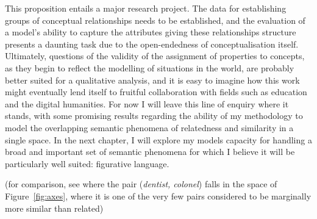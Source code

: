 This proposition entails a major research project.  The data for establishing groups of conceptual relationships needs to be established, and the evaluation of a model's ability to capture the attributes giving these relationships structure presents a daunting task due to the open-endedness of conceptualisation itself.  Ultimately, questions of the validity of the assignment of properties to concepts, as they begin to reflect the modelling of situations in the world, are probably better suited for a qualitative analysis, and it is easy to imagine how this work might eventually lend itself to fruitful collaboration with fields such as education and the digital humanities.  For now I will leave this line of enquiry where it stands, with some promising results regarding the ability of my methodology to model the overlapping semantic phenomena of relatedness and similarity in a single space.  In the next chapter, I will explore my models capacity for handling a broad and important set of semantic phenomena for which I believe it will be particularly well suited: figurative language.

(for comparison, see where the pair (\emph{dentist, colonel}) falls in the space of Figure~\ref{fig:axes}, where it is one of the very few pairs considered to be marginally more similar than related)
